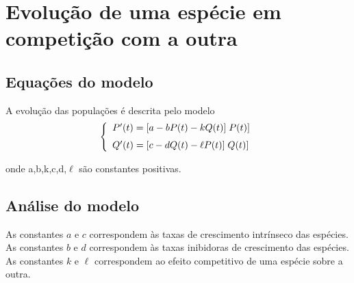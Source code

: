 \noindent
\section{Evolução de uma espécie em competição com a outra}
\subsection{Equações do modelo}

\noindent
A evolução das populações é descrita pelo modelo
\begin{equation}
\left\{
\begin{array}{l}
P'(t)=[a-bP(t)-kQ(t)]\;P(t)]  \medskip  \\
Q'(t)=[c-dQ(t)-\ell P(t)]\;Q(t)]
\end{array}
\right.
\end{equation}

\noindent
onde a,b,k,c,d,$\ell$ são constantes positivas.

\subsection{Análise do modelo}
\noindent
As constantes $a$ e $c$ correspondem às taxas de crescimento intrínseco das espécies.\newline
As constantes $b$ e $d$ correspondem às taxas inibidoras de crescimento das espécies.\newline
As constantes $k$ e $\ell$ correspondem ao efeito competitivo de uma espécie sobre a outra.
\medskip




